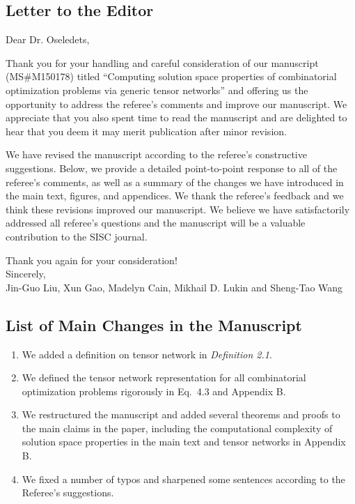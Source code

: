 \documentclass[longbibliography]{article}
\date{}
\begin{document}
\subsection{Letter to the Editor}\label{header-n558}

Dear Dr. Oseledets,

Thank you for your handling and careful consideration of our manuscript (MS\#M150178) titled ``Computing solution space properties of combinatorial optimization problems via generic tensor networks'' and offering us the opportunity to address the referee's comments and improve our manuscript. 
We appreciate that you also spent time to read the manuscript and are delighted to hear that you deem it may merit publication after minor revision.

We have revised the manuscript according to the referee's constructive suggestions.
Below, we provide a detailed point-to-point response to all of the referee's comments, as well as a summary of the changes we have introduced in the main text, figures, and appendices. We thank the referee's feedback and we think these revisions improved our manuscript. We believe we have satisfactorily addressed all referee's questions and the manuscript will be a valuable contribution to the SISC journal.

Thank you again for your consideration! \\

Sincerely,\\
Jin-Guo Liu, Xun Gao, Madelyn Cain, Mikhail D. Lukin and Sheng-Tao Wang


\subsection{List of Main Changes in the Manuscript}\label{header-n30}
\begin{enumerate}
\def\labelenumi{\arabic{enumi}.}
\item We added a definition on tensor network in \textit{Definition 2.1}.
\item We defined the tensor network representation for all combinatorial optimization problems rigorously in Eq.~4.3 and Appendix B.
\item We restructured the manuscript and added several theorems and proofs to the main claims in the paper, including the computational complexity of solution space properties in the main text and tensor networks in Appendix B.
\item We fixed a number of typos and sharpened some sentences according to the Referee's suggestions.
\end{enumerate}
\end{document}
